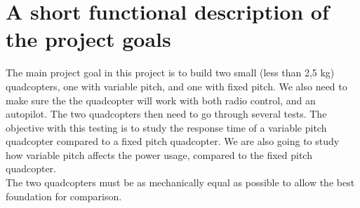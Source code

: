 \section{A short functional description of the project goals}

The main project goal in this project is to build two small (less than 2,5 kg) quadcopters, one with variable pitch, and one with fixed pitch. We also need to make sure the the quadcopter will work with both radio control, and an autopilot. The two quadcopters then need to go through several tests. The objective with this testing is to study the response time of a variable pitch quadcopter compared to a fixed pitch quadcopter. We are also going to study how variable pitch affects the power usage, compared to the fixed pitch quadcopter. \\ 
The two quadcopters must be as mechanically equal as possible to allow the best foundation for comparison.